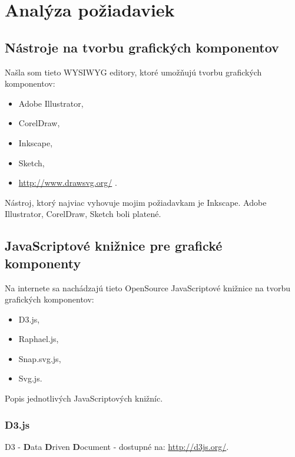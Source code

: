 \chapter{Analýza požiadaviek}

\section{Nástroje na tvorbu grafických komponentov}

Našla som tieto \acs{WYSIWYG} editory, ktoré umožňujú tvorbu grafických komponentov: 

\begin{itemize}
\item Adobe Illustrator, 
\item CorelDraw, 
\item Inkscape,
\item Sketch, 
\item \url{http://www.drawsvg.org/} .
\end{itemize}

Nástroj, ktorý najviac vyhovuje mojim požiadavkam je Inkscape. 
Adobe Illustrator, CorelDraw, Sketch boli platené. 



\section{JavaScriptové knižnice pre grafické komponenty}
Na internete sa nachádzajú tieto OpenSource JavaScriptové knižnice na tvorbu grafických komponentov: 
\begin{itemize}
	\item \acs{D3}.js, 
	\item Raphael.js, 
	\item Snap.svg.js,  
	\item Svg.js. 
\end{itemize}



Popis jednotlivých JavaScriptových knižníc.



\subsection{D3.js}
D3  - \textbf{D}ata \textbf{D}riven \textbf{D}ocument -  dostupné na: \url{http://d3js.org/}.

